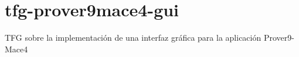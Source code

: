 \chapter{tfg-\/prover9mace4-\/gui}
\hypertarget{md_README}{}\label{md_README}
\label{md_README_autotoc_md0}%
%
TFG sobre la implementación de una interfaz gráfica para la aplicación Prover9-\/\+Mace4 